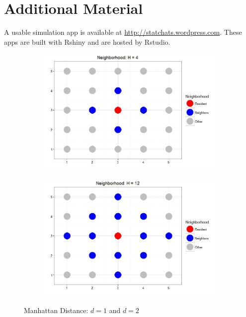 \chapter{Additional Material}

A usable simulation app is available at  \url{http://statchats.wordpress.com}. These apps are built with Rshiny and are hosted by Rstudio.

\label{AppendixA}
\begin{figure}[!h]
\centering
\begin{subfigure}{.45\textwidth}
  \centering
\includegraphics[scale=.33]{figures/H4.jpeg}
\end{subfigure}%
\begin{subfigure}{.45\textwidth}
  \centering
\includegraphics[scale=.33]{figures/H12.jpeg}
\end{subfigure}
\caption[Manhattan Distance]{Manhattan Distance: $d=1$ and $d=2$}
\label{fig:MD}
\end{figure}

